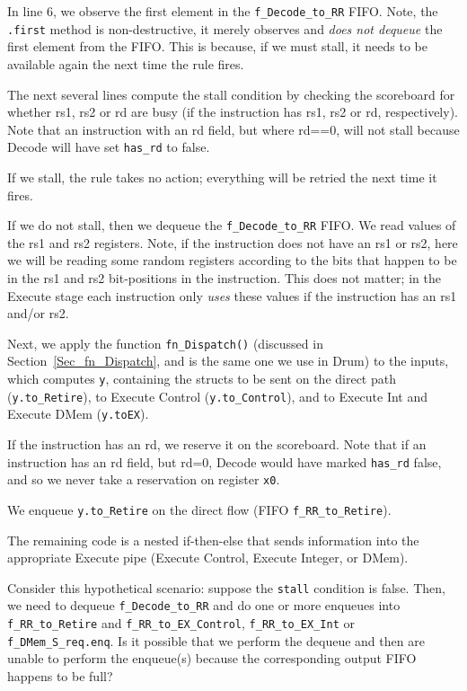 

In line 6, we observe the first element in the \verb|f_Decode_to_RR|
FIFO.  Note, the \verb|.first| method is non-destructive, {\ie} it
merely observes and \emph{does not dequeue} the first element from the
FIFO.  This is because, if we must stall, it needs to be available
again the next time the rule fires.

The next several lines compute the stall condition by checking the
scoreboard for whether rs1, rs2 or rd are busy (if the instruction has
rs1, rs2 or rd, respectively).  Note that an instruction with an rd
field, but where rd==0, will not stall because Decode will have set
\verb|has_rd| to false.

If we stall, the rule takes no action; everything will be retried the
next time it fires.

If we do not stall, then we dequeue the \verb|f_Decode_to_RR| FIFO.
We read values of the rs1 and rs2 registers.  Note, if the instruction
does not have an rs1 or rs2, here we will be reading some random
registers according to the bits that happen to be in the rs1 and rs2
bit-positions in the instruction.  This does not matter; in the
Execute stage each instruction only \emph{uses} these values if the
instruction has an rs1 and/or rs2.

Next, we apply the function \verb|fn_Dispatch()| (discussed in
Section~\ref{Sec_fn_Dispatch}, and is the same one we use in Drum) to
the inputs, which computes \verb|y|, containing the structs to be sent
on the direct path (\verb|y.to_Retire|), to Execute Control
(\verb|y.to_Control|), and to Execute Int and Execute DMem
(\verb|y.toEX|).

If the instruction has an rd, we reserve it on the scoreboard.  Note
that if an instruction has an rd field, but rd=0, Decode would have
marked \verb|has_rd| false, and so we never take a reservation on
register \verb|x0|.

We enqueue \verb|y.to_Retire| on the direct flow (FIFO
\verb|f_RR_to_Retire|).

The remaining code is a nested if-then-else that sends information
into the appropriate Execute pipe (Execute Control, Execute Integer,
or DMem).

\hdivider

\Exercise

Consider this hypothetical scenario: suppose the \verb|stall|
condition is false.  Then, we need to dequeue \verb|f_Decode_to_RR|
and do one or more enqueues into \verb|f_RR_to_Retire| and
\verb|f_RR_to_EX_Control|, \verb|f_RR_to_EX_Int| or
\verb|f_DMem_S_req.enq|.  Is it possible that we perform the dequeue
and then are unable to perform the enqueue(s) because the
corresponding output FIFO happens to be full?

